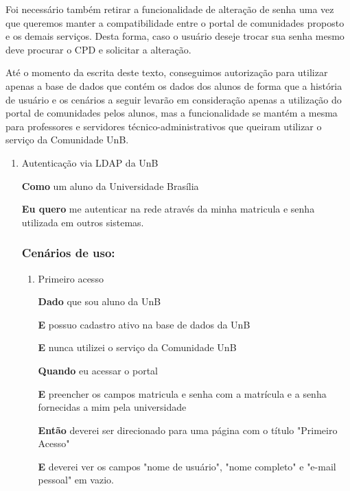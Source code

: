 Foi necessário também retirar a funcionalidade de alteração de senha uma vez
que queremos manter a compatibilidade entre o portal de comunidades proposto
e os demais serviços. Desta forma, caso o usuário deseje trocar sua senha 
mesmo deve procurar o CPD e solicitar a alteração.

Até o momento da escrita deste texto, conseguimos autorização para utilizar
apenas a base de dados que contém os dados dos alunos de forma que a
história de usuário e os cenários a seguir levarão em consideração apenas
a utilização do portal de comunidades pelos alunos, mas a funcionalidade
se mantém a mesma para professores e servidores técnico-administrativos que
queiram utilizar o serviço da Comunidade UnB.

\begin{enumerate}

\item Autenticação via LDAP da UnB

\textbf{Como} um aluno da Universidade Brasília

\textbf{Eu quero} me autenticar na rede através da minha matricula e senha
utilizada em outros sistemas.

\subsubsection*{Cenários de uso:}

\begin{enumerate}

\item Primeiro acesso

\textbf{Dado} que sou aluno da UnB

\textbf{E} possuo cadastro ativo na base de dados da UnB

\textbf{E} nunca utilizei o serviço da Comunidade UnB

\textbf{Quando} eu acessar o portal

\textbf{E} preencher os campos matricula e senha com a matrícula e a senha
fornecidas a mim pela universidade

\textbf{Então} deverei ser direcionado para uma página com o título
"Primeiro Acesso"

\textbf{E} deverei ver os campos "nome de usuário", "nome completo" e
"e-mail pessoal" em vazio.


\end{enumerate}
\end{enumerate}

